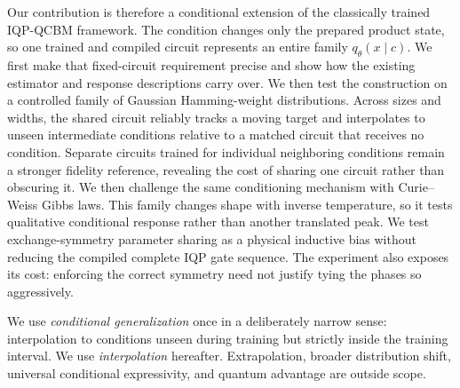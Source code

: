 \documentclass[a4paper,twocolumn,11pt,unpublished]{quantumarticle}
\begin{document}
Our contribution is therefore a conditional extension of the classically
trained IQP-QCBM framework.  The condition changes only the prepared product
state, so one trained and compiled circuit represents an entire family
$q_\theta(x\mid c)$.  We first make that fixed-circuit requirement precise and
show how the existing estimator and response descriptions carry over.  We then
test the construction on a controlled family of Gaussian Hamming-weight
distributions.  Across sizes and widths, the shared circuit reliably tracks a
moving target and interpolates to unseen intermediate conditions relative to
a matched circuit that receives no condition.  Separate circuits trained for
individual neighboring conditions remain a stronger fidelity reference,
revealing the cost of sharing one circuit rather than obscuring it.  We then
challenge the same conditioning mechanism with Curie--Weiss Gibbs laws.  This
family changes shape with inverse temperature, so it tests qualitative
conditional response rather than another translated peak.  We test
exchange-symmetry parameter sharing as a physical inductive bias without
reducing the compiled complete IQP gate sequence.  The experiment also exposes
its cost: enforcing the correct symmetry need not justify tying the phases so
aggressively.

We use \emph{conditional generalization} once in a deliberately narrow sense:
interpolation to conditions unseen during training but strictly inside the
training interval.  We use \emph{interpolation} hereafter.  Extrapolation,
broader distribution shift, universal conditional expressivity, and quantum
advantage are outside scope.
\end{document}
